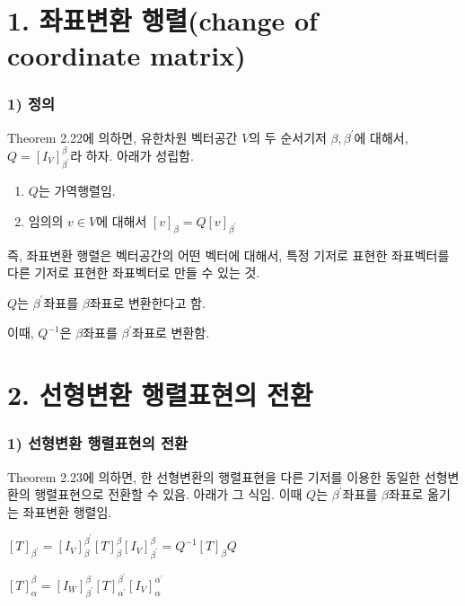 \documentclass[10pt, a4paper]{article}
\begin{document}
\section*{1. 좌표변환 행렬(change of coordinate matrix)}

\subsubsection*{1) 정의}
Theorem 2.22에 의하면, 유한차원 벡터공간 $V$의 두 순서기저 $\beta, \beta^{\prime}$에 대해서, $Q=[I_V]^{\beta}_{\beta^{\prime}}$라 하자. 아래가 성립함.

\begin{enumerate}
    \item $Q$는 가역행렬임.
    \item 임의의 $v \in V$에 대해서 $[v]_{\beta}=Q[v]_{\beta^{\prime}}$
\end{enumerate}

즉, 좌표변환 행렬은 벡터공간의 어떤 벡터에 대해서, 특정 기저로 표현한 좌표벡터를 다른 기저로 표현한 좌표벡터로 만들 수 있는 것.

$Q$는 $\beta^{\prime}$좌표를 $\beta$좌표로 변환한다고 함.

이때, $Q^{-1}$은 $\beta$좌표를 $\beta^{\prime}$좌표로 변환함.\\


\section*{2. 선형변환 행렬표현의 전환}
\subsubsection*{1) 선형변환 행렬표현의 전환}
Theorem 2.23에 의하면, 한 선형변환의 행렬표현을 다른 기저를 이용한 동일한 선형변환의 행렬표현으로 전환할 수 있음. 아래가 그 식임. 이때 $Q$는 $\beta^{\prime}$좌표를 $\beta$좌표로 옮기는 좌표변환 행렬임.

\begin{center}
$[T]_{\beta^{\prime}}=[I_V]_{\beta}^{\beta^\prime}[T]^{\beta}_{\beta}[I_V]_{\beta^{\prime}}^{\beta}=Q^{-1}[T]_{\beta}Q$
\end{center}

\begin{center}
$[T]_{\alpha}^{\beta}=[I_W]_{\beta^\prime}^{\beta}[T]_{\alpha^{\prime}}^{\beta^{\prime}}[I_V]_{\alpha}^{\alpha^{\prime}}$\\
\end{center}
\end{document}

